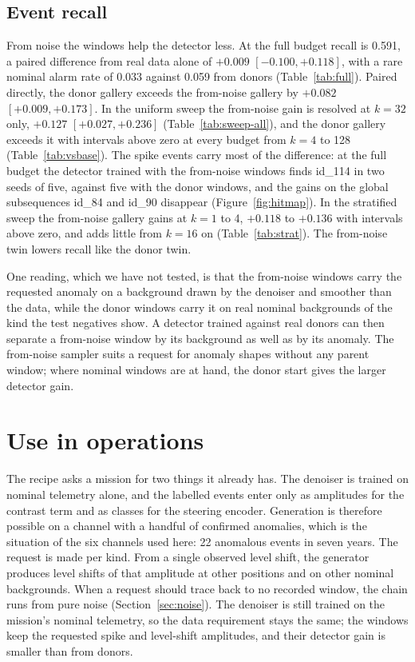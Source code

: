 \documentclass[11pt,a4paper]{article}
\begin{document}
\subsection{Event recall}
\label{sec:noise-detect}

From noise the windows help the detector less. At the full budget recall is
0.591, a paired difference from real data alone of $+0.009$
$[-0.100, +0.118]$, with a rare nominal alarm rate of 0.033 against 0.059
from donors (Table~\ref{tab:full}). Paired directly, the donor gallery exceeds
the from-noise gallery by $+0.082$ $[+0.009, +0.173]$. In the uniform sweep
the from-noise gain is resolved at $k = 32$ only, $+0.127$
$[+0.027, +0.236]$ (Table~\ref{tab:sweep-all}), and the donor gallery exceeds
it with intervals above zero at every budget from $k = 4$ to 128
(Table~\ref{tab:vsbase}). The spike events carry most of the difference: at
the full budget the detector trained with the from-noise windows finds id\_114
in two seeds of five, against five with the donor windows, and the gains on
the global subsequences id\_84 and id\_90 disappear
(Figure~\ref{fig:hitmap}). In the stratified sweep the from-noise gallery
gains at $k = 1$ to 4, $+0.118$ to $+0.136$ with intervals above zero, and
adds little from $k = 16$ on (Table~\ref{tab:strat}). The from-noise twin
lowers recall like the donor twin.

One reading, which we have not tested, is that the from-noise windows carry
the requested anomaly on a background drawn by the denoiser and smoother than
the data, while the donor windows carry it on real nominal backgrounds of the
kind the test negatives show. A detector trained against real donors can then
separate a from-noise window by its background as well as by its anomaly. The
from-noise sampler suits a request for anomaly shapes without any parent
window; where nominal windows are at hand, the donor start gives the larger
detector gain.

\section{Use in operations}
\label{sec:ops}

The recipe asks a mission for two things it already has. The denoiser is
trained on nominal telemetry alone, and the labelled events enter only as
amplitudes for the contrast term and as classes for the steering encoder.
Generation is therefore possible on a channel with a handful of confirmed
anomalies, which is the situation of the six channels used here: 22 anomalous
events in seven years. The request is made per kind. From a single observed
level shift, the generator produces level shifts of that amplitude at other
positions and on other nominal backgrounds. When a request should trace back
to no recorded window, the chain runs from pure noise
(Section~\ref{sec:noise}). The denoiser is still trained on the mission's
nominal telemetry, so the data requirement stays the same; the windows keep
the requested spike and level-shift amplitudes, and their detector gain is
smaller than from donors.
\end{document}
